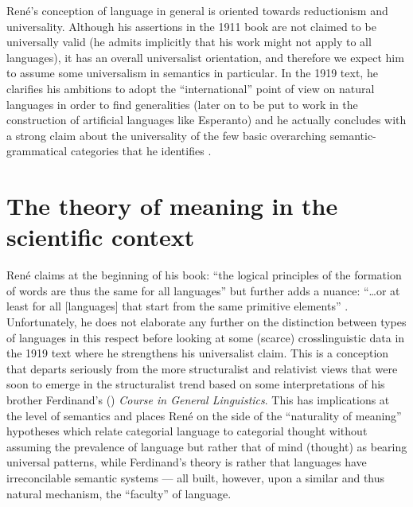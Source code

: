 \documentclass[output=paper]{langsci/langscibook}
\begin{document}
René’s conception of language in general is oriented towards
reductionism and universality. Although his assertions in the 1911
book are not claimed to be universally valid (he admits implicitly
that his work might not apply to all languages), it has an overall
universalist orientation, and therefore we expect him to assume some
universalism in semantics in particular. In the 1919 text, he
clarifies his ambitions to adopt the ``international'' point of view on
natural languages in order to find generalities (later on to be put to
work in the construction of artificial languages like Esperanto)
\citep[5]{r.desaussure19:structure.logique} and he actually
concludes with a strong claim about the universality of the few basic
overarching semantic-grammatical categories that he identifies
\citep[26]{r.desaussure19:structure.logique}.

\section{The theory of meaning in the scientific context}
\label{sec:theory-of-meaning}

René claims at the beginning of his book: “the logical principles of
the formation of words are thus the same for all languages” but
further adds a nuance: ``\ldots or at least for all [languages] that
start from the same primitive elements”
\citep[4]{r.desaussure11:formation}. Unfortunately, he does not
elaborate any further on the distinction between types of languages in
this respect before looking at some (scarce) crosslinguistic data in
the 1919 text where he strengthens his universalist claim. This is a
conception that departs seriously from the more structuralist and
relativist views that were soon to emerge in the structuralist trend
based on some interpretations of his brother Ferdinand's
(\citeyear{saussure16:cours-original}) \emph{Course in General
  Linguistics}. This has implications at the level of semantics and
places René on the side of the ``naturality of meaning'' hypotheses which
relate categorial language to categorial thought without assuming the
prevalence of language but rather that of mind (thought) as bearing
universal patterns, while Ferdinand’s theory is rather that languages
have irreconcilable semantic systems --- all built, however, upon a
similar and thus natural mechanism, the ``faculty'' of language.
\end{document}
